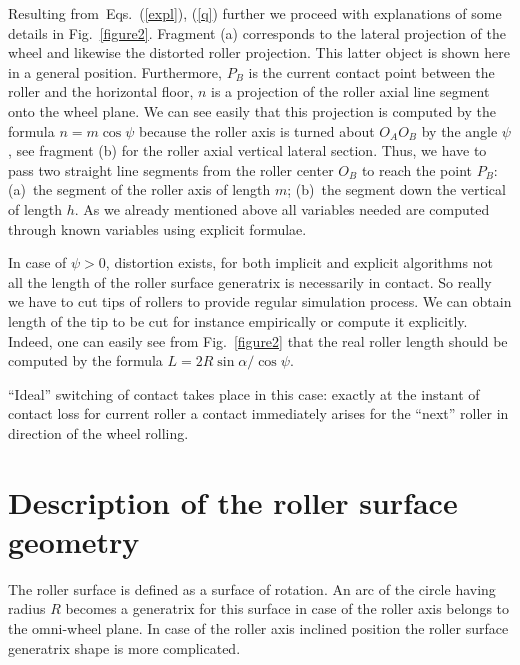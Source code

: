 \documentclass{jsme-tj}
\begin{document}
Resulting from~Eqs.~(\ref{expl}), (\ref{q}) further we proceed with 
explanations of some details in Fig.~\ref{figure2}. Fragment (a) corresponds to 
the lateral projection of the wheel and likewise the distorted roller 
projection. This latter object is shown here in a general position. 
Furthermore, $P_B$ is the current contact point between the roller and the 
horizontal floor, $n$ is a projection of the roller axial line segment onto the 
wheel plane. We can see easily that this projection is computed by the formula 
$n=m\cos\psi $ because the roller axis is turned about $O_AO_B$ by the angle 
$\psi $, see fragment (b) for the roller axial vertical lateral section. Thus, 
we have to pass two straight line segments from the roller center $O_B$ 
to reach the point $P_B$: (a)~the segment of the roller axis of length $m$; 
(b)~the segment down the vertical of length $h$. As we already mentioned above
all variables needed are computed through known variables using explicit 
formulae.

In case of $\psi >0$, distortion exists, for both implicit and explicit 
algorithms not all the length of the roller surface generatrix is necessarily
in contact. So really we have to cut tips of rollers to provide regular
simulation process. We can obtain length of the tip to be cut for instance 
empirically or compute it explicitly. Indeed, one can easily see from 
Fig.~\ref{figure2} that the real roller length should be computed by the
formula $L=2R\sin\alpha /\cos\psi $.

``Ideal'' switching of contact takes place in this case: exactly at the instant 
of contact loss for current roller a contact immediately arises for the 
``next'' roller in direction of the wheel rolling.

\section{Description of the roller surface geometry}

The roller surface is defined as a surface of rotation. An arc of the circle
having radius $R$ becomes a generatrix for this surface in case of the roller
axis belongs to the omni-wheel plane. In case of the roller axis inclined 
position the roller surface generatrix shape is more complicated.
\end{document}
